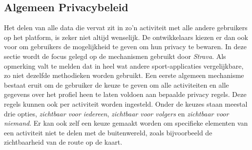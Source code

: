 \subsection{Algemeen Privacybeleid}\label{sec:Algemene Privacy}
Het delen van alle data die vervat zit in zo'n activiteit met alle andere
gebruikers op het platform, is zeker niet altijd wenselijk. De ontwikkelaars
kiezen er dan ook voor om gebruikers de mogelijkheid te geven om hun privacy te
bewaren. In deze sectie wordt de focus gelegd op de mechanismen gebruikt door
\textit{Strava}. Als opmerking valt te melden dat in heel wat andere
sport-applicaties vergelijkbare, zo niet dezelfde methodieken worden gebruikt.
Een eerste algemeen mechanisme bestaat eruit om de gebruiker de keuze te geven
om alle activiteiten en alle gegevens over het profiel heen te laten voldoen
aan bepaalde privacy regels. Deze regels kunnen ook per activiteit worden
ingesteld. Onder de keuzes staan meestal drie opties, \textit{zichtbaar voor
    iedereen}, \textit{zichtbaar voor volgers} en \textit{zichtbaar voor niemand}.
Er kan ook zelf een keuze gemaakt worden om specifieke elementen van een
activiteit niet te delen met de buitenwereld, zoals bijvoorbeeld de
zichtbaarheid van de route op de kaart.\cite{Activity24:online}

